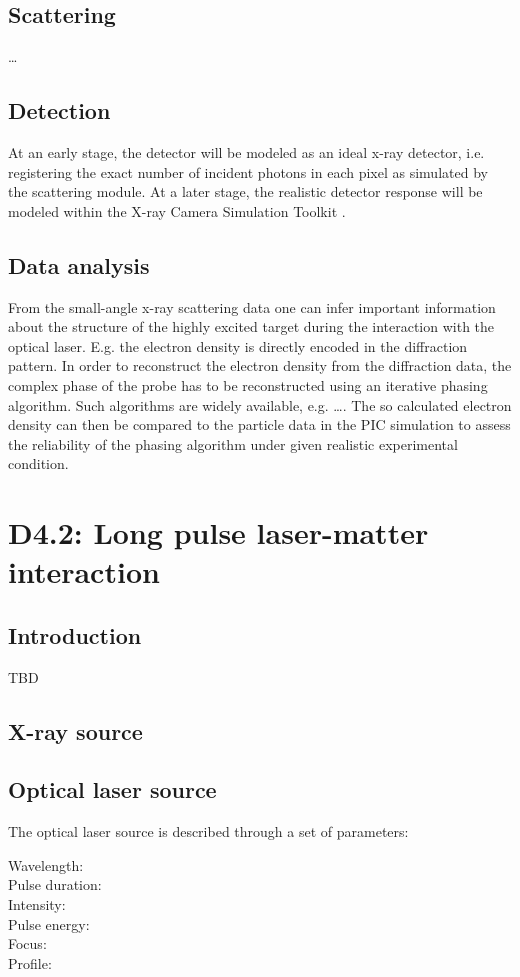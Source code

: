 \documentclass[a4paper]{article}
\begin{document}
\subsection{Scattering}
\ldots {}
\subsection{Detection}
At an early stage, the detector will be modeled as an ideal x-ray detector, i.e. registering the exact number of incident photons in each
pixel as simulated by the scattering module. At a later stage, the realistic detector response will be modeled within the
X-ray Camera Simulation Toolkit \cite{Joy2015}.%
%
\subsection{Data analysis}
From the small-angle x-ray scattering data one can infer important information about the structure of the highly excited target during
the interaction with the optical laser. E.g. the electron density is directly encoded in the diffraction pattern. In order to
reconstruct the electron density from the diffraction data, the complex phase of the probe has to be reconstructed using an iterative phasing
algorithm. Such algorithms are widely available, e.g. \ldots {}.
The so calculated electron density can then be compared to the particle data in the PIC simulation to assess the reliability of
the phasing algorithm under given realistic experimental condition. 

\section{D4.2: Long pulse laser-matter interaction\label{sec:long_pulse}}
\subsection{Introduction}
TBD
\subsection{X-ray source}
\subsection{Optical laser source}
The optical laser source is described through a set of parameters:
\begin{description}
  \item[Wavelength:]
  \item[Pulse duration:]
  \item[Intensity:]
  \item[Pulse energy:]
  \item[Focus:]
  \item[Profile:]
\end{description}
\end{document}
